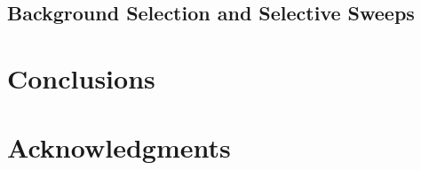 \documentclass[9pt,twocolumn,twoside]{gsajnl}
\begin{document}

\subsection*{Background Selection and Selective Sweeps}

\section*{Conclusions}
\section*{Acknowledgments}



\end{document}

